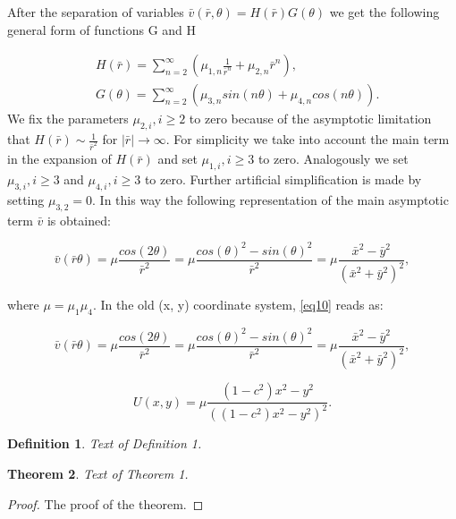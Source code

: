 \documentclass[12pt]{article}
\theoremstyle{theorem}
\newtheorem{theorem}{Theorem}
\theoremstyle{defi}
\newtheorem{definition}[theorem]{Definition}
\begin{document}
After the separation of variables $\bar{v}(\bar{r}, \theta) = H(\bar{r})G(\theta)$  we get the following general form of functions G and H 

\begin{align}
&H(\bar{r}) = \sum^{\infty}_{n=2} (\mu_{1,n} \frac{1}{ \bar{r}^n} + \mu_{2,n} \bar{r}^n ),
\\ \nonumber &G(\theta) = \sum^{\infty}_{n=2} (\mu_{3,n}sin(n \theta ) + \mu_{4,n}cos(n \theta)). \label{eq9}
\end{align}
We fix the parameters $\mu_{2,i}, i \geq 2$  to zero because of the asymptotic limitation that $H(\bar{r}) \sim \frac{1}{\bar{r}^2} $  for $|\bar{r}| \rightarrow \infty $.
For simplicity we take into account the main term in the expansion of $H(\bar{r})$ and set $\mu_{1,i}, i \geq 3$  to zero. Analogously we set $\mu_{3,i}, i \geq 3$ and $\mu_{4,i}, i \geq 3$
to zero.  Further artificial simplification is made by setting $\mu_{3,2} = 0$. In this way the following representation of the main asymptotic term $\bar{v}$ is obtained:

\begin{equation}
\bar{v}(\bar{r} \theta) = \mu \frac{cos(2 \theta)}{ \bar{r}^2 } = 
 \mu \frac{cos(\theta) ^ 2 - sin(\theta)^2}{ \bar{r}^2 } = 
 \mu \frac{\bar{x}  ^ 2 - \bar{y}  ^ 2}{( \bar{x}  ^ 2 + \bar{y}  ^ 2)^2 } , \label{eq10}
\end{equation}

where $\mu = \mu_1 \mu_4$. In the old (x, y) coordinate system, \ref{eq10}  reads as:

\begin{equation}
\bar{v}(\bar{r} \theta) = \mu \frac{cos(2 \theta)}{ \bar{r}^2 } = 
 \mu \frac{cos(\theta) ^ 2 - sin(\theta)^2}{ \bar{r}^2 } = 
 \mu \frac{\bar{x}  ^ 2 - \bar{y}  ^ 2}{( \bar{x}  ^ 2 + \bar{y}  ^ 2)^2 } , \label{eq10}
\end{equation}

\begin{equation}
U(x,y) = \mu \frac{(1-c^2)x^2 - y^2}{ ( (1-c^2)x^2 - y^2 )^2 }. \label{eq11}
\end{equation}


\begin{definition}
Text of Definition 1.
\end{definition}

\begin{theorem}
Text of Theorem 1.
\end{theorem}

\begin{proof}
The proof of the theorem.
\end{proof}
\end{document}
